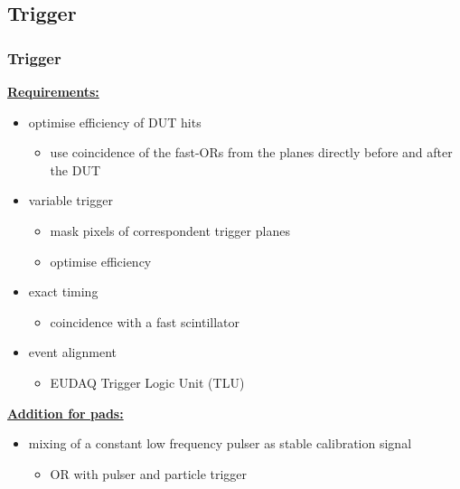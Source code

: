 \documentclass[9pt]{beamer}
\begin{document}
\subsection{Trigger}
\begin{frame}
	\frametitle{Trigger}
	\underline{\textbf{Requirements:}}\s
	\begin{itemize}
		\setlength{\itemsep}{\fill}
		\item optimise efficiency of DUT hits
		\begin{itemize}
			\item use coincidence of the fast-ORs from the planes directly before and after the DUT
		\end{itemize}
		\item variable trigger
		\begin{itemize}
			\item mask pixels of correspondent trigger planes
			\item optimise efficiency
		\end{itemize}
		\item exact timing
		\begin{itemize}
			\item coincidence with a fast scintillator
		\end{itemize}
		\item event alignment
		\begin{itemize}
			\item EUDAQ Trigger Logic Unit (TLU)
		\end{itemize}
	\end{itemize}
	\vspace*{.5cm}
	\underline{\textbf{Addition for pads:}}\s
	\begin{itemize}
		\item mixing of a constant low frequency pulser as stable calibration signal
		\begin{itemize}
			\item OR with pulser and particle trigger
		\end{itemize}
	\end{itemize}
\end{frame}
\end{document}
